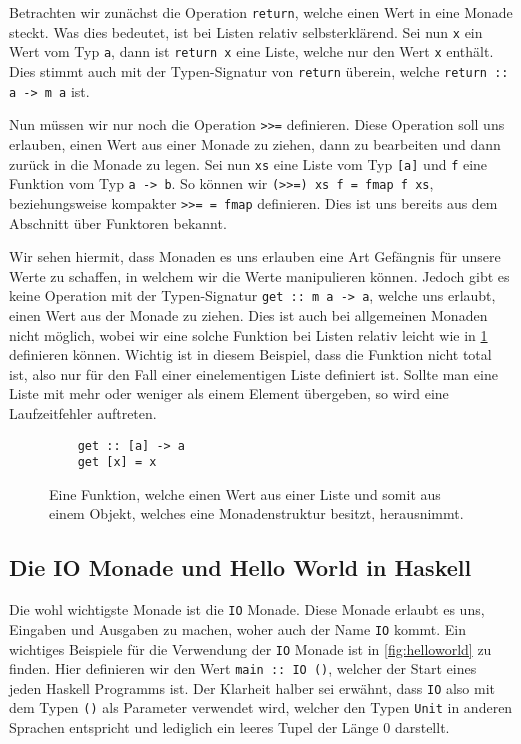 \documentclass{hhuarticle}
\theoremstyle{definition}
\theoremstyle{theorem}
\begin{document}
  Betrachten wir zunächst die Operation \verb|return|, welche einen
  Wert in eine Monade steckt. Was dies bedeutet, ist bei Listen relativ
  selbsterklärend. Sei nun \verb|x| ein Wert vom Typ \verb|a|, dann
  ist \verb|return x| eine Liste, welche nur den Wert \verb|x| enthält.
  Dies stimmt auch mit der Typen-Signatur von \verb|return| überein,
  welche \verb|return :: a -> m a| ist.

  Nun müssen wir nur noch die Operation \verb|>>=| definieren. Diese
  Operation soll uns erlauben, einen Wert aus einer Monade zu ziehen,
  dann zu bearbeiten und dann zurück in die Monade zu legen.
  Sei nun \verb|xs| eine Liste vom Typ \verb|[a]| und \verb|f| eine
  Funktion vom Typ \verb|a -> b|. So können wir \verb|(>>=) xs f = fmap f xs|,
  beziehungsweise kompakter \verb|>>= = fmap| definieren. Dies ist
  uns bereits aus dem Abschnitt über Funktoren bekannt.

  Wir sehen hiermit, dass Monaden es uns erlauben eine Art \glqq Gefängnis\grqq 
  für unsere Werte zu schaffen, in welchem wir die Werte manipulieren
  können. Jedoch gibt es keine Operation mit der Typen-Signatur
  \verb|get :: m a -> a|, welche uns erlaubt, einen Wert aus der
  Monade zu ziehen. Dies ist auch bei allgemeinen Monaden nicht möglich,
  wobei wir eine solche Funktion bei Listen relativ leicht wie in
  \cref{fig:listeget} definieren können. Wichtig ist in diesem Beispiel,
  dass die Funktion nicht total ist, also nur für den Fall einer einelementigen
  Liste definiert ist. Sollte man eine Liste mit mehr oder weniger als
  einem Element übergeben, so wird eine Laufzeitfehler auftreten.

  \begin{figure}[h]
    \begin{verbatim}
    get :: [a] -> a
    get [x] = x
    \end{verbatim}
    \caption{Eine Funktion, welche einen Wert aus einer Liste und somit aus einem Objekt, welches eine Monadenstruktur besitzt, herausnimmt.}%
    \label{fig:listeget}
  \end{figure}

  \subsection{Die IO Monade und Hello World in Haskell}

  Die wohl wichtigste Monade ist die \verb|IO| Monade. Diese Monade
  erlaubt es uns, Eingaben und Ausgaben zu machen, woher auch der
  Name \verb|IO| kommt. Ein wichtiges Beispiele für die Verwendung der
  \verb|IO| Monade ist in \cref{fig:helloworld} zu finden. Hier definieren
  wir den Wert \verb|main :: IO ()|, welcher der Start eines jeden
  Haskell Programms ist. Der Klarheit halber sei erwähnt, dass \verb|IO|
  also mit dem Typen \verb|()| als Parameter verwendet wird, welcher
  den Typen \verb|Unit| in anderen Sprachen entspricht und lediglich
  ein leeres Tupel der Länge 0 darstellt.
\end{document}

